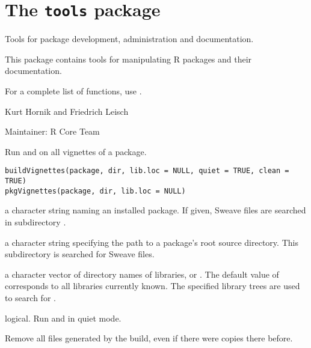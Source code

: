 
\chapter{The \texttt{tools} package}
%
\begin{Description}\relax
Tools for package development, administration and documentation.
\end{Description}
%
\begin{Details}\relax
This package contains tools for manipulating R packages and their
documentation.

For a complete list of functions, use .

\end{Details}
%
\begin{Author}\relax
Kurt Hornik and Friedrich Leisch

Maintainer: R Core Team 
\end{Author}
%
\begin{Description}\relax
Run  and  on all vignettes
of a package.
\end{Description}
%
\begin{Usage}
\begin{verbatim}
buildVignettes(package, dir, lib.loc = NULL, quiet = TRUE, clean = TRUE)
pkgVignettes(package, dir, lib.loc = NULL)
\end{verbatim}
\end{Usage}
%
\begin{Arguments}
\begin{ldescription}
\item[\code{package}] a character string naming an installed package.  If
given, Sweave files are searched in subdirectory .
\item[\code{dir}] a character string specifying the path to a package's root
source directory.  This subdirectory  is searched for
Sweave files.
\item[\code{lib.loc}] a character vector of directory names of \R{} libraries,
or .  The default value of  corresponds to all
libraries currently known.  The specified library trees are used to
search for .
\item[\code{quiet}] logical. Run  and
 in quiet mode.
\item[\code{clean}] Remove all files generated by the build, even if there
were copies there before.
\end{ldescription}
\end{Arguments}
